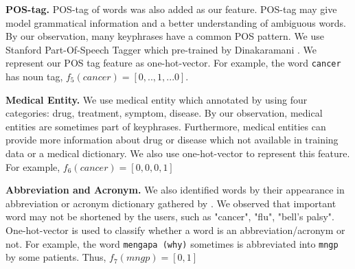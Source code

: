 \textbf{POS-tag.} POS-tag of words was also added as our feature. POS-tag may give model grammatical information and a better understanding of ambiguous words. By our observation, many keyphrases have a common POS pattern. We use Stanford Part-Of-Speech Tagger which pre-trained by Dinakaramani \cite{dinakaramani2014designing}. We represent our POS tag feature as one-hot-vector. For example, the word \texttt{cancer} has noun tag, $f_5(cancer) = [0, ..,1, ...0]$.

\textbf{Medical Entity.} We use medical entity which annotated by \cite{skripsiWahid} using four categories: drug, treatment, symptom, disease. By our observation, medical entities are sometimes part of keyphrases. Furthermore, medical entities can provide more information about drug or disease which not available in training data or a medical dictionary. We also use one-hot-vector to represent this feature. For example, $f_6(cancer) = [0, 0, 0 ,1]$

\textbf{Abbreviation and Acronym.} We also identified words by their appearance in abbreviation or acronym dictionary gathered by \cite{skripsiKakAbid}. We observed that important word may not be shortened by the users, such as "cancer", "flu", "bell’s palsy". One-hot-vector is used to classify whether a word is an abbreviation/acronym or not. For example, the word \texttt{mengapa (why)} sometimes is abbreviated into \texttt{mngp} by some patients. Thus, $f_7(mngp) = [0, 1]$ 

